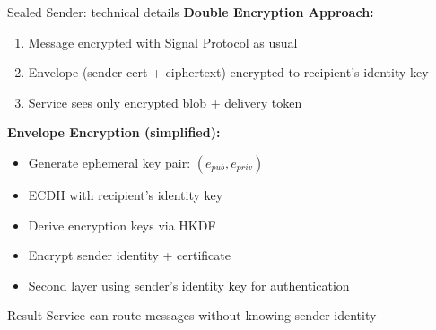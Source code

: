 \documentclass[aspectratio=169, lualatex, handout]{beamer}
\begin{document}
\begin{frame}{Sealed Sender: technical details}
	\textbf{Double Encryption Approach:}
	\begin{enumerate}
		\item Message encrypted with Signal Protocol as usual
		\item Envelope (sender cert + ciphertext) encrypted to recipient's identity key
		\item Service sees only encrypted blob + delivery token
	\end{enumerate}
	\textbf{Envelope Encryption (simplified):}
	\begin{itemize}
		\item Generate ephemeral key pair: $(e_{pub}, e_{priv})$
		\item ECDH with recipient's identity key
		\item Derive encryption keys via HKDF
		\item Encrypt sender identity + certificate
		\item Second layer using sender's identity key for authentication
	\end{itemize}
	\begin{alertblock}{Result}
		Service can route messages without knowing sender identity
	\end{alertblock}
\end{frame}
\end{document}
